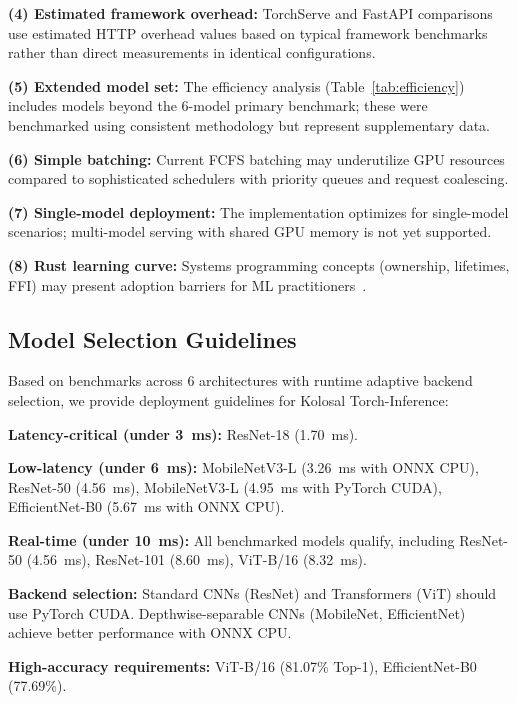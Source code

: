 \documentclass[10pt,twocolumn,a4paper]{article}
\theoremstyle{definition}
\theoremstyle{plain}
\begin{document}
\textbf{(4) Estimated framework overhead:} TorchServe and FastAPI comparisons use estimated HTTP overhead values based on typical framework benchmarks rather than direct measurements in identical configurations.

\textbf{(5) Extended model set:} The efficiency analysis (Table~\ref{tab:efficiency}) includes models beyond the 6-model primary benchmark; these were benchmarked using consistent methodology but represent supplementary data.

\textbf{(6) Simple batching:} Current FCFS batching may underutilize GPU resources compared to sophisticated schedulers with priority queues and request coalescing.

\textbf{(7) Single-model deployment:} The implementation optimizes for single-model scenarios; multi-model serving with shared GPU memory is not yet supported.

\textbf{(8) Rust learning curve:} Systems programming concepts (ownership, lifetimes, FFI) may present adoption barriers for ML practitioners~\citep{rust2023adoption}.

\subsection{Model Selection Guidelines}

Based on benchmarks across 6 architectures with runtime adaptive backend selection, we provide deployment guidelines for Kolosal Torch-Inference:

\textbf{Latency-critical (under \SI{3}{\milli\second}):} ResNet-18 (\SI{1.70}{\milli\second}).

\textbf{Low-latency (under \SI{6}{\milli\second}):} MobileNetV3-L (\SI{3.26}{\milli\second} with ONNX CPU), ResNet-50 (\SI{4.56}{\milli\second}), MobileNetV3-L (\SI{4.95}{\milli\second} with PyTorch CUDA), EfficientNet-B0 (\SI{5.67}{\milli\second} with ONNX CPU).

\textbf{Real-time (under \SI{10}{\milli\second}):} All benchmarked models qualify, including ResNet-50 (\SI{4.56}{\milli\second}), ResNet-101 (\SI{8.60}{\milli\second}), ViT-B/16 (\SI{8.32}{\milli\second}).

\textbf{Backend selection:} Standard CNNs (ResNet) and Transformers (ViT) should use PyTorch CUDA. Depthwise-separable CNNs (MobileNet, EfficientNet) achieve better performance with ONNX CPU.

\textbf{High-accuracy requirements:} ViT-B/16 (81.07\% Top-1), EfficientNet-B0 (77.69\%).
\end{document}
